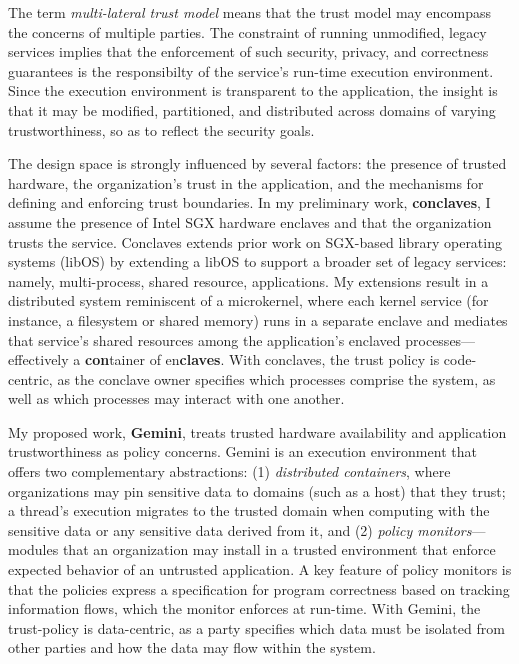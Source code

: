 

The term \emph{multi-lateral trust model} means that the trust model may
encompass the concerns of multiple parties.
%
The constraint of running unmodified, legacy services implies that the
enforcement of such security, privacy, and correctness guarantees is the
responsibilty of the service's run-time execution environment. 
%
Since the execution environment is transparent to the application, the insight
is that it may be modified, partitioned, and distributed across domains of
varying trustworthiness, so as to reflect the security goals.


The design space is strongly influenced by several factors: the presence of
trusted hardware, the organization's trust in the application, and the
mechanisms for defining and enforcing trust boundaries.
%
In my preliminary work, \textbf{conclaves}, I assume the presence of Intel SGX hardware
enclaves and that the organization trusts the service.
%
Conclaves extends prior work on SGX-based library operating systems (libOS) by
extending a libOS to support a broader set of legacy services: namely,
multi-process, shared resource, applications.
%
My extensions result in a distributed system reminiscent of a microkernel,
where each kernel service (for instance, a filesystem or shared memory)
runs in a separate enclave and mediates that service’s shared resources
among the application’s enclaved processes---effectively a \textbf{con}tainer
of en\textbf{claves}.
%
With conclaves, the trust policy is code-centric, as the conclave owner
specifies which processes comprise the system, as well as which processes may
interact with one another.


My proposed work, \textbf{Gemini}, treats trusted hardware availability and
application trustworthiness as policy concerns.
%
Gemini is an execution environment that offers two complementary abstractions:
(1) \emph{distributed containers}, where organizations may pin sensitive data to
domains (such as a host) that they trust; a thread's execution migrates to the
trusted domain when computing with the sensitive data or any sensitive data
derived from it, and (2) \emph{policy monitors}---modules that an organization
may install in a trusted environment that enforce expected behavior of an
untrusted application.
%
A key feature of policy monitors is that the policies express a specification
for program correctness based on tracking information flows, which
the monitor enforces at run-time.
%
With Gemini, the trust-policy is data-centric, as a party specifies which data
must be isolated from other parties and how the data may flow within the
system.


